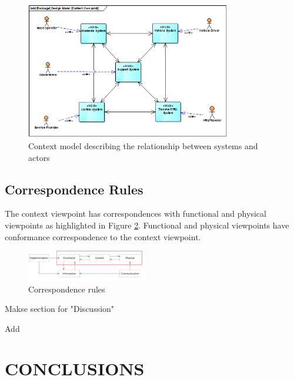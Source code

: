 \documentclass[letterpaper, 10 pt, conference]{ieeeconf}  %
\begin{document}
\begin{figure}[t!]
	\centering
	\includegraphics[width=0.80\textwidth]{context_model}
	\caption{Context model describing the relationship between systems and actors}
	\label{context_model}
	\centering
\end{figure}

\subsection{Correspondence Rules}

The context viewpoint has correspondences with functional and physical viewpoints as highlighted in Figure \ref{correspondence_rules}. Functional and physical viewpoints have conformance correspondence to the context viewpoint.

\begin{figure}[ht!]
	\centering
	\includegraphics[width=0.47\textwidth]{correspondence_rules}
	\caption{Correspondence rules}
	\label{correspondence_rules}
	\centering
\end{figure}

Makse section for "Discussion"

Add

\section{CONCLUSIONS}
\end{document}
